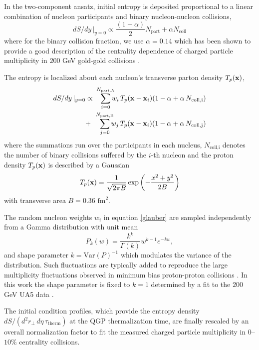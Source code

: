 \documentclass[aps,prc,reprint,amsmath,nofootinbib,superscriptaddress]{revtex4-1}
\begin{document}
In the two-component ansatz, initial entropy is deposited proportional to a linear combination of nucleon participants and binary nucleon-nucleon collisions,
\begin{equation}
 dS/dy \,\vert_{y=0} \propto \frac{(1-\alpha)}{2}N_\text{part} + \alpha N_\text{coll}
 \label{twocomponent}
\end{equation}
where for the binary collision fraction, we use $\alpha=0.14$ which has been shown to provide a good description of the centrality dependence of charged particle 
multiplicity in $200$ GeV gold-gold collisions \cite{Shen:2014sfi}.

The entropy is localized about each nucleon's transverse parton density $T_p({\bf x})$,
\begin{eqnarray}
 dS/dy \,\vert_{y=0} &\propto& \smashoperator{\sum_{i=0}^{N_\text{part,A}}} w_i\, T_p({\bf x} - {\bf x}_i)(1-\alpha + \alpha\, N_\text{coll,i}) \nonumber \\
                     &+& \smashoperator{\sum_{j=0}^{N_\text{part,B}}} w_j\, T_p({\bf x} - {\bf x}_i)(1-\alpha + \alpha\, N_\text{coll,j})
 \label{glauber}
\end{eqnarray}
where the summations run over the participants in each nucleus, $N_\text{coll,i}$ denotes the number of binary collisions suffered by the $i$-th nucleon 
and the proton density $T_p({\bf x})$ is described by a Gaussian
\begin{equation}
 T_p({\bf x}) = \frac{1}{\sqrt{2 \pi B}} \exp \left(-\frac{x^2+y^2}{2 B} \right)
\end{equation}
with transverse area $B = 0.36$ $\text{fm}^2$.

The random nucleon weights $w_i$ in equation \eqref{glauber} are sampled independently from a Gamma distribution with unit mean
\begin{equation}
 P_k(w) = \frac{k^k}{\Gamma(k)} w^{k-1} e^{-k w},
\end{equation}
and shape parameter $k = \text{Var}(P)^{-1}$ which modulates the variance of the distribution. 
Such fluctuations are typically added to reproduce the large multiplicity fluctuations observed in minimum bias proton-proton collisions \cite{Adare:2008ns, Dumitru:2012yr, Moreland:2012qw, Bozek:2013uha, Shen:2014sfi}. 
In this work the shape parameter is fixed to $k=1$ determined by a fit to the $200$ GeV UA5 data \cite{Ansorge:1988kn}. 

The initial condition profiles, which provide the entropy density $dS/(d^2r_\perp\, d\eta\, \tau_\text{therm})$ at the QGP thermalization time, are finally 
rescaled by an overall normalization factor to fit the measured charged particle multiplicity in $0$--$10\%$ centrality collisions.
\end{document}
